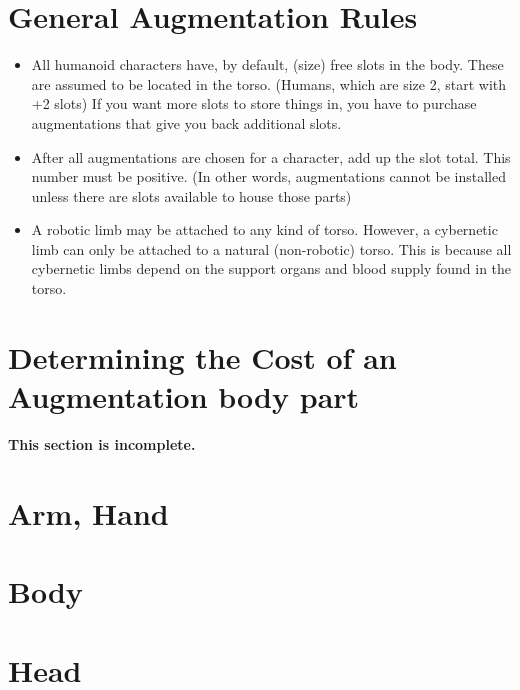 \documentclass[twoside]{book}
\begin{document}
    

\section{General Augmentation Rules}
    
\begin{itemize}
      
  \item   All humanoid characters have, by default, (size)
               free slots in the body. These are assumed to be located in
               the torso. (Humans, which are size 2, start with +2 slots)
               If you want more slots to store things in, you have to
               purchase augmentations that give you back additional
               slots. 
  \item   After all augmentations are chosen for a character,
               add up the slot total. This number must be positive. (In
               other words, augmentations cannot be installed unless
               there are slots available to house those parts) 
  \item   A robotic limb may be attached to any kind of
               torso. However, a cybernetic limb can only be attached to
               a natural (non-robotic) torso. This is because all
               cybernetic limbs depend on the support organs and blood
               supply found in the torso. 
\end{itemize}
  
    

\section{Determining the Cost of an Augmentation body part}
    

 \textbf{ This section is incomplete. }


    

\section{Arm, Hand}
    
    

\section{Body}
    
    

\section{Head}
    
\end{document}
